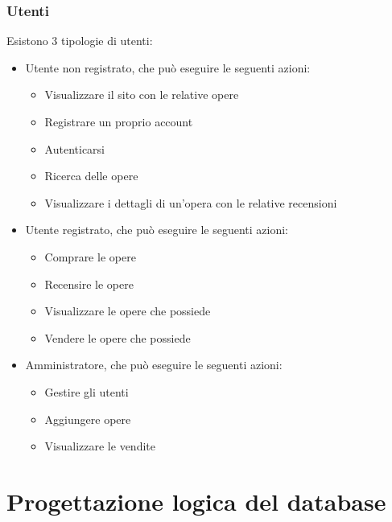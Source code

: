\documentclass[10pt]{article}
\begin{document}
\subsubsection{Utenti}
Esistono 3 tipologie di utenti:
\begin{itemize}
    \item Utente non registrato, che può eseguire le seguenti azioni:
    \begin{itemize}
        \item Visualizzare il sito con le relative opere
        \item Registrare un proprio account
        \item Autenticarsi
        \item Ricerca delle opere
        \item Visualizzare i dettagli di un'opera con le relative recensioni
    \end{itemize}
    \item Utente registrato, che può eseguire le seguenti azioni:
    \begin{itemize}
        \item Comprare le opere
        \item Recensire le opere
        \item Visualizzare le opere che possiede
        \item Vendere le opere che possiede
    \end{itemize}
    \item Amministratore, che può eseguire le seguenti azioni:
    \begin{itemize}
        \item Gestire gli utenti
        \item Aggiungere opere
        \item Visualizzare le vendite
    \end{itemize}
\end{itemize}

\section{Progettazione logica del database}
\end{document}
